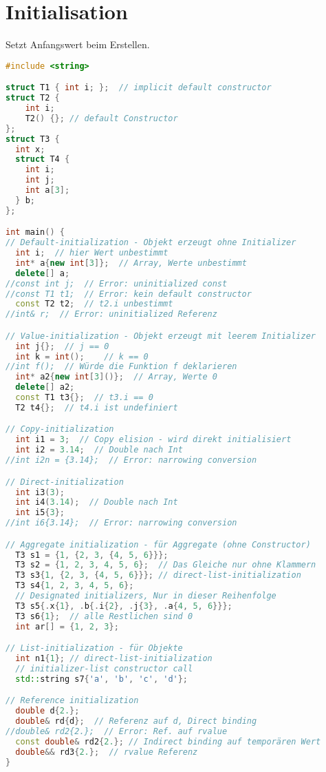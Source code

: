 \section{Initialisation}

Setzt Anfangswert beim Erstellen.

\begin{lstlisting}[language=C++]
#include <string>

struct T1 { int i; };  // implicit default constructor
struct T2 {
    int i;
    T2() {}; // default Constructor
};
struct T3 {
  int x;
  struct T4 {
    int i;
    int j;
    int a[3];
  } b;
};

int main() {
// Default-initialization - Objekt erzeugt ohne Initializer
  int i;  // hier Wert unbestimmt
  int* a{new int[3]};  // Array, Werte unbestimmt
  delete[] a;
//const int j;  // Error: uninitialized const
//const T1 t1;  // Error: kein default constructor
  const T2 t2;  // t2.i unbestimmt
//int& r;  // Error: uninitialized Referenz

// Value-initialization - Objekt erzeugt mit leerem Initializer
  int j{};  // j == 0
  int k = int();    // k == 0
//int f();  // Würde die Funktion f deklarieren
  int* a2{new int[3]()};  // Array, Werte 0
  delete[] a2;
  const T1 t3{};  // t3.i == 0
  T2 t4{};  // t4.i ist undefiniert

// Copy-initialization
  int i1 = 3;  // Copy elision - wird direkt initialisiert
  int i2 = 3.14;  // Double nach Int
//int i2n = {3.14};  // Error: narrowing conversion

// Direct-initialization
  int i3(3);
  int i4(3.14);  // Double nach Int
  int i5{3};
//int i6{3.14};  // Error: narrowing conversion

// Aggregate initialization - für Aggregate (ohne Constructor)
  T3 s1 = {1, {2, 3, {4, 5, 6}}};
  T3 s2 = {1, 2, 3, 4, 5, 6};  // Das Gleiche nur ohne Klammern
  T3 s3{1, {2, 3, {4, 5, 6}}}; // direct-list-initialization
  T3 s4{1, 2, 3, 4, 5, 6};
  // Designated initializers, Nur in dieser Reihenfolge
  T3 s5{.x{1}, .b{.i{2}, .j{3}, .a{4, 5, 6}}};
  T3 s6{1};  // alle Restlichen sind 0
  int ar[] = {1, 2, 3};

// List-initialization - für Objekte
  int n1{1}; // direct-list-initialization
  // initializer-list constructor call
  std::string s7{'a', 'b', 'c', 'd'};

// Reference initialization
  double d{2.};
  double& rd{d};  // Referenz auf d, Direct binding
//double& rd2{2.};  // Error: Ref. auf rvalue
  const double& rd2{2.}; // Indirect binding auf temporären Wert
  double&& rd3{2.};  // rvalue Referenz
}
\end{lstlisting}